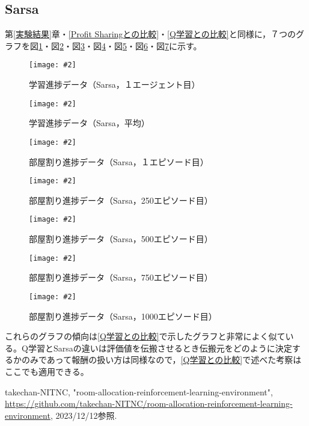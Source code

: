 \documentclass[titlepage]{ltjsreport}
\newcommand{\image}[2]{\begin{figure}[h]\vspace{1em}\begin{center}\texttt{[image: \#2]}\caption{#1}\label{#1}\end{center}\end{figure}}
\begin{document}
\subsection{Sarsa}
第\ref{実験結果}章・\ref{Profit Sharingとの比較}・\ref{Q学習との比較}と同様に，７つのグラフを図\ref{学習進捗データ（Sarsa，１エージェント目）}・図\ref{学習進捗データ（Sarsa，平均）}・図\ref{部屋割り進捗データ（Sarsa，１エピソード目）}・図\ref{部屋割り進捗データ（Sarsa，250エピソード目）}・図\ref{部屋割り進捗データ（Sarsa，500エピソード目）}・図\ref{部屋割り進捗データ（Sarsa，750エピソード目）}・図\ref{部屋割り進捗データ（Sarsa，1000エピソード目）}に示す。
\image{学習進捗データ（Sarsa，１エージェント目）}{外部ファイル/学習進捗データ/Sarsa/１エージェント目.png}
\image{学習進捗データ（Sarsa，平均）}{外部ファイル/学習進捗データ/Sarsa/平均.png}
\image{部屋割り進捗データ（Sarsa，１エピソード目）}{外部ファイル/部屋割り進捗データ/Sarsa/１エピソード目}
\image{部屋割り進捗データ（Sarsa，250エピソード目）}{外部ファイル/部屋割り進捗データ/Sarsa/250エピソード目}
\image{部屋割り進捗データ（Sarsa，500エピソード目）}{外部ファイル/部屋割り進捗データ/Sarsa/500エピソード目}
\image{部屋割り進捗データ（Sarsa，750エピソード目）}{外部ファイル/部屋割り進捗データ/Sarsa/750エピソード目}
\image{部屋割り進捗データ（Sarsa，1000エピソード目）}{外部ファイル/部屋割り進捗データ/Sarsa/1000エピソード目}

これらのグラフの傾向は\ref{Q学習との比較}で示したグラフと非常によく似ている。Q学習とSarsaの違いは評価値を伝搬させるとき伝搬元をどのように決定するかのみであって報酬の扱い方は同様なので，\ref{Q学習との比較}で述べた考察はここでも適用できる。
\begin{thebibliography}{99}
 takechan-NITNC, "room-allocation-reinforcement-learning-environment", \url{https://github.com/takechan-NITNC/room-allocation-reinforcement-learning-environment}, 2023/12/12参照.
\end{thebibliography}
\end{document}
